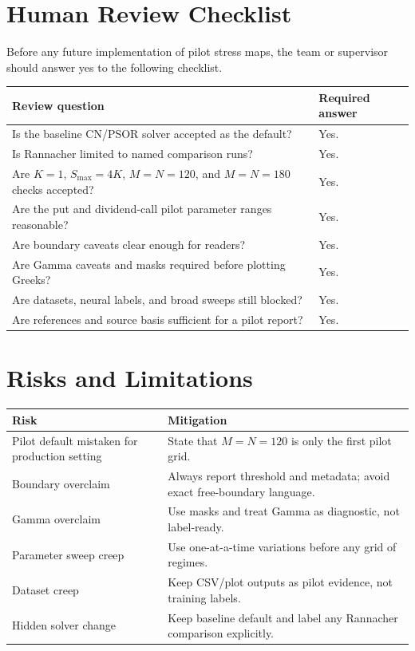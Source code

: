 \documentclass[11pt,a4paper]{article}
\begin{document}
\section{Human Review Checklist}

Before any future implementation of pilot stress maps, the team or supervisor should answer yes
to the following checklist.

\begin{longtable}{L{0.60\textwidth} L{0.24\textwidth}}
\toprule
Review question & Required answer \\
\midrule
\endhead
Is the baseline CN/PSOR solver accepted as the default? & Yes. \\
Is Rannacher limited to named comparison runs? & Yes. \\
Are \(K=1\), \(S_{\max}=4K\), \(M=N=120\), and \(M=N=180\) checks accepted? & Yes. \\
Are the put and dividend-call pilot parameter ranges reasonable? & Yes. \\
Are boundary caveats clear enough for readers? & Yes. \\
Are Gamma caveats and masks required before plotting Greeks? & Yes. \\
Are datasets, neural labels, and broad sweeps still blocked? & Yes. \\
Are references and source basis sufficient for a pilot report? & Yes. \\
\bottomrule
\end{longtable}

\section{Risks and Limitations}

\begin{longtable}{L{0.30\textwidth} L{0.56\textwidth}}
\toprule
Risk & Mitigation \\
\midrule
\endhead
Pilot default mistaken for production setting & State that \(M=N=120\) is only the first pilot grid. \\
Boundary overclaim & Always report threshold and metadata; avoid exact free-boundary language. \\
Gamma overclaim & Use masks and treat Gamma as diagnostic, not label-ready. \\
Parameter sweep creep & Use one-at-a-time variations before any grid of regimes. \\
Dataset creep & Keep CSV/plot outputs as pilot evidence, not training labels. \\
Hidden solver change & Keep baseline default and label any Rannacher comparison explicitly. \\
\bottomrule
\end{longtable}
\end{document}
